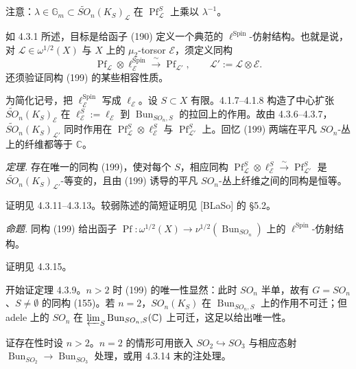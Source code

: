 注意：$\lambda\in\mathbb{G}_{m}\subset\tilde{SO}_{n}(K_{S})_{\mathcal{L}}$ 在 $\operatorname{Pf}_{\mathcal{L}}^{S}$ 上乘以 $\lambda^{-1}$。

 如 4.3.1 所述，目标是给函子 (190) 定义一个典范的 $\ell^{\operatorname{Spin}}$-仿射结构。也就是说，对 $\mathcal{L}\in\omega^{1/2}(X)$ 与 $X$ 上的 $\mu_{2}$-torsor $\mathcal{E}$，须定义同构
\begin{equation}\tag{199}
\operatorname{Pf}_{\mathcal{L}}\otimes\ell^{\operatorname{Spin}}_{\mathcal{E}}\xrightarrow{\ \sim\ }\operatorname{Pf}_{\mathcal{L}'},\qquad \mathcal{L}':=\mathcal{L}\otimes\mathcal{E}.
\end{equation}
还须验证同构 (199) 的某些相容性质。

为简化记号，把 $\ell^{\operatorname{Spin}}_{\mathcal{E}}$ 写成 $\ell_{\mathcal{E}}$。设 $S\subset X$ 有限。4.1.7–4.1.8 构造了中心扩张 $\tilde{SO}_{n}(K_{S})_{\mathcal{E}}$ 在 $\ell^{S}_{\mathcal{E}}:=\ell_{\mathcal{E}}$ 到 $\operatorname{Bun}_{SO_{n},S}$ 的拉回上的作用。故由 4.3.6–4.3.7，$\tilde{SO}_{n}(K_{S})_{\mathcal{L}'}$ 同时作用在 $\operatorname{Pf}_{\mathcal{L}}^{S}\otimes\ell^{S}_{\mathcal{E}}$ 与 $\operatorname{Pf}_{\mathcal{L}'}^{S}$ 上。回忆 (199) 两端在平凡 $SO_{n}$-丛上的纤维都等于 $\mathbb{C}$。

 \emph{定理.} 存在唯一的同构 (199)，使对每个 $S$，相应同构 $\operatorname{Pf}_{\mathcal{L}}^{S}\otimes\ell^{S}_{\mathcal{E}}\xrightarrow{\ \sim\ }\operatorname{Pf}_{\mathcal{L}'}^{S}$ 是 $\tilde{SO}_{n}(K_{S})_{\mathcal{L}'}$-等变的，且由 (199) 诱导的平凡 $SO_{n}$-丛上纤维之间的同构是恒等。

证明见 4.3.11–4.3.13。较弱陈述的简短证明见 [BLaSo] 的 §5.2。

 \emph{命题.} 同构 (199) 给出函子 $\operatorname{Pf}:\omega^{1/2}(X)\to\nu^{1/2}(\operatorname{Bun}_{SO_{n}})$ 上的 $\ell^{\operatorname{Spin}}$-仿射结构。

证明见 4.3.15。

 开始证定理 4.3.9。$n>2$ 时 (199) 的唯一性显然：此时 $SO_{n}$ 半单，故有 $G=SO_{n}$、$S\neq\emptyset$ 的同构 (155)。若 $n=2$，$SO_{n}(K_{S})$ 在 $\operatorname{Bun}_{SO_{n},S}$ 上的作用不可迁；但 adele 上的 $SO_{n}$ 在 $\varprojlim_{S}\operatorname{Bun}_{SO_{n},S}(\mathbb{C})$ 上可迁，这足以给出唯一性。

证存在性时设 $n>2$。$n=2$ 的情形可用嵌入 $SO_{2}\hookrightarrow SO_{3}$ 与相应态射 $\operatorname{Bun}_{SO_{2}}\to\operatorname{Bun}_{SO_{3}}$ 处理，或用 4.3.14 末的注处理。


